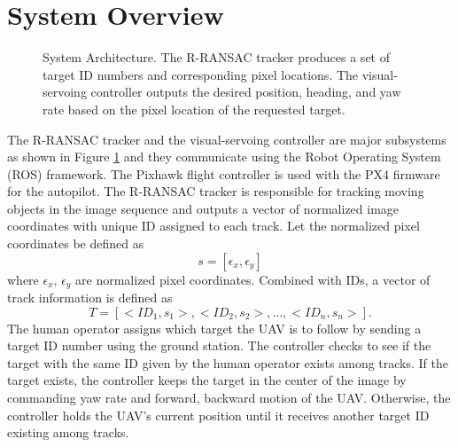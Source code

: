 \section{System Overview}
\begin{figure}[htbp]
	\centering
	\caption{System Architecture. The R-RANSAC tracker produces a set of target ID numbers and corresponding pixel locations. The visual-servoing controller outputs the desired position, heading, and yaw rate based on the pixel location of the requested target.}
	\label{system}
\end{figure}
The R-RANSAC tracker and the visual-servoing controller are major subsystems as shown in Figure \ref{system} and they communicate using the Robot Operating System (ROS) framework. The Pixhawk flight controller is used with the PX4 firmware for the autopilot. The R-RANSAC tracker is responsible for tracking moving objects in the image sequence and outputs a vector of normalized image coordinates with unique ID assigned to each track. Let the normalized pixel coordinates be defined as 
\begin{equation}
s = [\epsilon_x, \epsilon_y]
\end{equation} where $\epsilon_x$, $\epsilon_y$ are normalized pixel coordinates. Combined with IDs, a vector of track information is defined as 
\begin{equation}
T = [<ID_1, s_1>, <ID_2, s_2>, \dots, <ID_n, s_n>].
\end{equation}
The human operator assigns which target the UAV is to follow by sending a target ID number using the ground station. The controller checks to see if the target with the same ID given by the human operator exists among tracks. If the target exists, the controller keeps the target in the center of the image by commanding yaw rate and forward, backward motion of the UAV. Otherwise, the controller holds the UAV's current position until it receives another target ID existing among tracks. 

